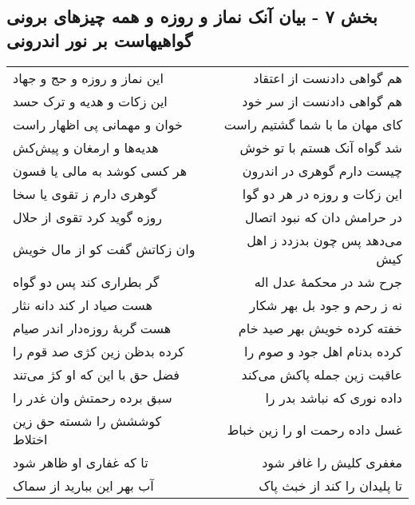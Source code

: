 \begin{center}
\section*{بخش ۷ - بیان آنک نماز و روزه و همه چیزهای برونی گواهیهاست بر نور اندرونی}
\label{sec:sh007}
\begin{longtable}{l p{0.5cm} r}
این نماز و روزه و حج و جهاد
&&
هم گواهی دادنست از اعتقاد
\\
این زکات و هدیه و ترک حسد
&&
هم گواهی دادنست از سر خود
\\
خوان و مهمانی پی اظهار راست
&&
کای مهان ما با شما گشتیم راست
\\
هدیه‌ها و ارمغان و پیش‌کش
&&
شد گواه آنک هستم با تو خوش
\\
هر کسی کوشد به مالی یا فسون
&&
چیست دارم گوهری در اندرون
\\
گوهری دارم ز تقوی یا سخا
&&
این زکات و روزه در هر دو گوا
\\
روزه گوید کرد تقوی از حلال
&&
در حرامش دان که نبود اتصال
\\
وان زکاتش گفت کو از مال خویش
&&
می‌دهد پس چون بدزدد ز اهل کیش
\\
گر بطراری کند پس دو گواه
&&
جرح شد در محکمهٔ عدل اله
\\
هست صیاد ار کند دانه نثار
&&
نه ز رحم و جود بل بهر شکار
\\
هست گربهٔ روزه‌دار اندر صیام
&&
خفته کرده خویش بهر صید خام
\\
کرده بدظن زین کژی صد قوم را
&&
کرده بدنام اهل جود و صوم را
\\
فضل حق با این که او کژ می‌تند
&&
عاقبت زین جمله پاکش می‌کند
\\
سبق برده رحمتش وان غدر را
&&
داده نوری که نباشد بدر را
\\
کوششش را شسته حق زین اختلاط
&&
غسل داده رحمت او را زین خباط
\\
تا که غفاری او ظاهر شود
&&
مغفری کلیش را غافر شود
\\
آب بهر این ببارید از سماک
&&
تا پلیدان را کند از خبث پاک
\\
\end{longtable}
\end{center}

